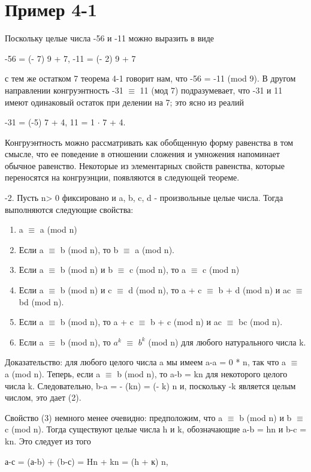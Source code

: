 \documentclass[11pt]{article}
\begin{document}
	\section{Пример 4-1}
	Поскольку целые числа -56 и -11 можно выразить в виде
	\begin{center}
		-56 = (- 7) 9 + 7, -11 = (- 2) 9 + 7
	\end{center}
	с тем же остатком 7 теорема 4-1 говорит нам, что -56 = -11 (mod 9). В другом направлении конгруэнтность -31 $\equiv$ 11 (мод 7) подразумевает, что -31 и 11 имеют одинаковый остаток при делении на 7; это ясно из реалий
	\begin{center}
		-31 = (-5) 7 + 4, 11 = 1 $\cdot$ 7 + 4.
	\end{center}	
	Конгруэнтность можно рассматривать как обобщенную форму равенства в том смысле, что ее поведение в отношении сложения и умножения напоминает обычное равенство. Некоторые из элементарных свойств равенства, которые переносятся на конгруэнции, появляются в следующей теореме.
	\begin{enumerate}
		-2. Пусть n> 0 фиксировано и a, b, c, d - произвольные целые числа. Тогда выполняются следующие свойства:
		
	\end{enumerate}
	\begin{enumerate}
		\item a $\equiv$ a (mod n)
		\item Если a $\equiv$ b (mod n), то b $\equiv$ a (mod n).
		\item Если a $\equiv$ b (mod n) и b $\equiv$ c (mod n), то a $\equiv$ c (mod n)
		\item Если a $\equiv$ b (mod n) и c $\equiv$ d (mod n), то a + c $\equiv$ b + d (mod n) и ac $\equiv$ bd (mod n).
		\item Если a $\equiv$ b (mod n), то a + c $\equiv$ b + c (mod n) и ac $\equiv$ bc (mod n).
		\item Если a $\equiv$ b (mod n), то $a^{k}$ $\equiv$ $b^{k}$ (mod n) для любого натурального числа k.
	\end{enumerate}
	Доказательство: для любого целого числа a мы имеем a-a = 0 * n, так что a $\equiv$ a (mod n). Теперь, если a $\equiv$ b (mod n), то a-b = kn для некоторого целого числа k. Следовательно, b-a = - (kn) = (- k) n и, поскольку -k является целым числом, это дает (2).
	
	Свойство (3) немного менее очевидно: предположим, что a $\equiv$ b (mod n) и b $\equiv$ c (mod n). Тогда существуют целые числа h и k, обозначающие a-b = hn и b-c = kn. Это следует из того
	\begin{center}
		а-с = (а-b) + (b-с) = Hn + kn = (h + к) n,
	\end{center}
	
\end{document}
